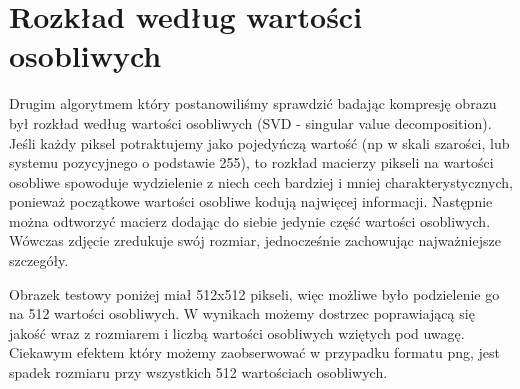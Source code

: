 \section{Rozkład według wartości osobliwych}\label{sec:compression_svd}

Drugim algorytmem który postanowiliśmy sprawdzić badając kompresję obrazu
był rozkład według wartości osobliwych (SVD - singular value decomposition).
Jeśli każdy piksel potraktujemy jako pojedyńczą wartość (np w skali szarości,
lub systemu pozycyjnego o podstawie 255), to rozkład macierzy pikseli na wartości
osobliwe spowoduje wydzielenie z niech cech bardziej i mniej charakterystycznych,
ponieważ początkowe wartości osobliwe kodują najwięcej informacji. Następnie można
odtworzyć macierz dodając do siebie jedynie część wartości osobliwych. Wówczas zdjęcie
zredukuje swój rozmiar, jednocześnie zachowując najważniejsze szczegóły.

Obrazek testowy poniżej miał 512x512 pikseli, więc możliwe było podzielenie go na 512
wartości osobliwych. W wynikach możemy dostrzec poprawiającą się jakość wraz z rozmiarem
i liczbą wartości osobliwych wziętych pod uwagę. Ciekawym efektem który możemy zaobserwować
w przypadku formatu png, jest spadek rozmiaru przy wszystkich 512 wartościach osobliwych.

